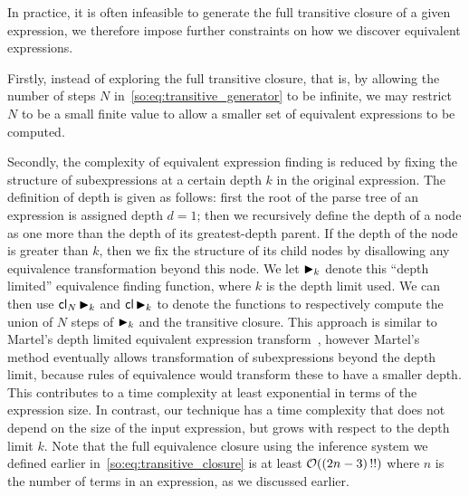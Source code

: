 In practice, it is often infeasible to generate the full transitive closure of
a given expression, we therefore impose further constraints on how we discover
equivalent expressions.

Firstly, instead of exploring the full transitive closure, that is, by allowing
the number of steps $N$ in~\eqref{so:eq:transitive_generator} to be infinite,
we may restrict $N$ to be a small finite value to allow a smaller set of
equivalent expressions to be computed.

Secondly, the complexity of equivalent expression finding is reduced by
fixing the structure of subexpressions at a certain depth $k$ in the original
expression.  The definition of depth is given as follows: first the root of
the parse tree of an expression is assigned depth $d = 1$; then we recursively
define the depth of a node as one more than the depth of its greatest-depth
parent.  If the depth of the node is greater than $k$, then we fix the
structure of its child nodes by disallowing any equivalence transformation
beyond this node. We let $\operatorname{\blacktriangleright}_k$ denote this ``depth limited'' equivalence
finding function, where $k$ is the depth limit used.  We can then use
$\mathsf{cl}_N \operatorname{\blacktriangleright}_k$ and $\mathsf{cl} \operatorname{\blacktriangleright}_k$ to denote the functions to
respectively compute the union of $N$ steps of $\operatorname{\blacktriangleright}_k$ and the transitive
closure. This approach is similar to Martel's depth limited equivalent
expression transform~\cite{martel07}, however Martel's method eventually allows
transformation of subexpressions beyond the depth limit, because rules of
equivalence would transform these to have a smaller depth.  This contributes
to a time complexity at least exponential in terms of the expression size. In
contrast, our technique has a time complexity that does not depend on the size
of the input expression, but grows with respect to the depth limit $k$. Note
that the full equivalence closure using the inference system we defined earlier
in~\eqref{so:eq:transitive_closure} is at least $\operatorname{\mathcal{O}}((2n - 3)\,!!)$ where $n$
is the number of terms in an expression, as we discussed earlier.

